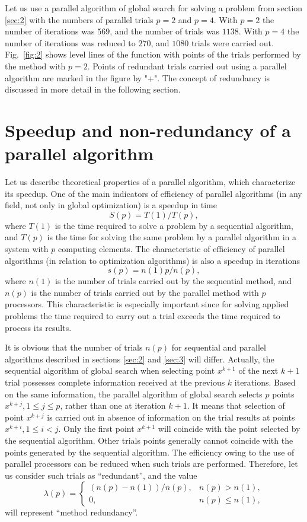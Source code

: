 \documentclass[smallcondensed]{svjour3}     %
\begin{document}
Let us use a parallel algorithm of global search for solving a problem from section \ref{sec:2} with the numbers of parallel trials $p=2$ and $p=4$. With $p=2$ the number of iterations was $569$, and the number of trials was $1138$. With $p=4$ the number of iterations was reduced to $270$, and $1080$ trials were carried out. Fig.~\ref{fig:2} shows level lines of the function with points of the trials performed by the method with $p=2$. Points of redundant trials carried out using a parallel algorithm are marked in the figure by "+". The concept of redundancy is discussed in more detail in the following section.

\section{Speedup and non-redundancy of a parallel algorithm} \label{sec:4}

Let us describe theoretical properties of a parallel algorithm, which characterize its speedup. One of the main indicators of efficiency of parallel algorithms (in any field, not only in global optimization) is a speedup in time
\[
S(p)=T(1)/T(p),
\]
where $T(1)$ is the time required to solve a problem by a sequential algorithm, and $T(p)$ is the time for solving the same problem by a parallel algorithm in a system with $p$ computing elements. The characteristic of efficiency of parallel algorithms (in relation to optimization algorithms) is also a speedup in iterations
\begin{equation}\label{eq:26}
s(p)=n(1)p/n(p),
\end{equation}
where $n(1)$ is the number of trials carried out by the sequential method, and $n(p)$ is the number of trials carried out by the parallel method with $p$ processors. This characteristic is especially important since for solving applied problems the time required to carry out a trial exceeds the time required to process its results.

It is obvious that the number of trials $n(p)$ for sequential and parallel algorithms described in sections \ref{sec:2} and \ref{sec:3} will differ. Actually, the sequential algorithm of global search when selecting point $x^{k+1}$ of the next $k+1$ trial possesses complete information received at the previous $k$ iterations. Based on the same information, the parallel algorithm of global search selects $p$ points $x^{k+j}, 1\leq j \leq p$, rather than one at iteration $k+1$. It means that selection of point $x^{k+j}$ is carried out in absence of information on the trial results at points $x^{k+i}, 1\leq i<j$. Only the first point $x^{k+1}$ will coincide with the point selected by the sequential algorithm. Other trials points generally cannot coincide with the points generated by the sequential algorithm. The efficiency owing to the use of parallel processors can be reduced when such trials are performed. Therefore, let us consider such trials as ``redundant'', and the value 
\[
\lambda(p) = \left\{
   \begin{array}{lr}
     (n(p)-n(1))/n(p), & n(p) > n(1),\\
     0, & n(p)\leq n(1),
   \end{array}
\right.
\]
will represent ``method redundancy''.
\end{document}
